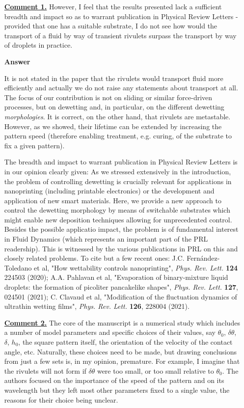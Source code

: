 \documentclass[12pt,english]{article}
\begin{document}
\begin{itemize}

\item[ \textbf{\underline{Comment 1.}}]
{ 
However, I feel that the
results presented lack a sufficient breadth and impact so as to
warrant publication in Physical Review Letters - provided that one has
a suitable substrate, I do not see how would the transport of a fluid
by way of transient rivulets surpass the transport by way of droplets
in practice.
}

\item[ \textbf{{Answer}}]
{ 
It is not stated in the paper that the rivulets would transport fluid more efficiently and actually we do not raise any statements about transport at all. The focus of our contribution is not on sliding or similar force-driven processes, but 
on dewetting and, in particular, on the different dewetting {\it morphologies}. 
It is correct, on the other hand, that rivulets are metastable. However, as 
we showed, their lifetime can be extended by increasing the pattern speed
(therefore enabling treatment, e.g. curing, of the substrate to 
fix a given pattern).

The breadth and impact to warrant publication in Physical Review Letters is in our opinion clearly given: As we stressed extensively in the introduction,
the problem of controlling dewetting is crucially relevant for applications in 
nanoprinting (including printable electronics) or the development and application of new smart materials. Here, we provide a new approach to control the dewetting morphology by means of switchable substrates which might enable new deposition techniques allowing for unprecedented control. 
Besides the possible applicatio impact, the problem is of fundamental interest in Fluid Dynamics (which represents an important part of the 
PRL readership).
This is witnessed by the various publications in PRL on this and closely related problems. To cite but a few recent ones: J.C. Fern\'andez-Toledano et al, "How wettability controls nanoprinting",
{\it Phys. Rev. Lett.} {\bf 124} 224503 (2020); A.A. Pahlavan et al,
"Evaporation of binary-mixture liquid droplets: the formation of picoliter pancakelike shapes", {\it Phys. Rev. Lett.} {\bf 127}, 024501 (2021); C. Clavaud et al, "Modification of the fluctuation dynamics of ultrathin wetting films", {\it Phys. Rev. Lett.} {\bf 126}, 228004 (2021).
}


\item[ \textbf{\underline{Comment 2.}}]
{ 
The core of the manuscript is a numerical study which includes a
number of model parameters and specific choices of their values, say
$\theta_0$, $ \delta \theta$, $\delta$, $h_0$, 
the square pattern itself, the
orientation of the velocity of the contact angle, etc. Naturally,
these choices need to be made, but drawing conclusions from just a few
sets is, in my opinion, premature.
For example, I imagine that the rivulets will not form if $\delta\theta$ were too small, or too small relative to $\theta_0$. 
The authors focused on the importance of the speed of the pattern and on its wavelength but they left most other parameters fixed to a single value, the reasons for their choice being unclear.
}


\end{itemize}
\end{document}
